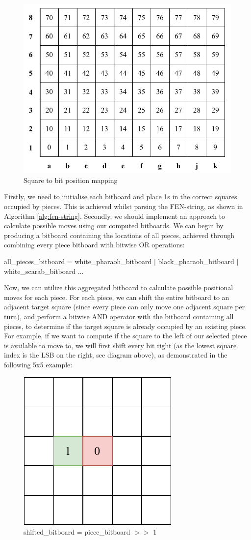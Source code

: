 \documentclass[../main/main.tex]{subfiles}
\begin{document}
\begin{figure}[H]
    \centering
    \includegraphics[width=0.6\columnwidth]{../design/assets/bitboard_indexes.pdf}
    \caption{Square to bit position mapping}
    \label{fig:bitboard-indexes}
\end{figure}

Firstly, we need to initialise each bitboard and place 1s in the correct squares occupied by pieces. This is achieved whilst parsing the FEN-string, as shown in Algorithm \ref{alg:fen-string}.
Secondly, we should implement an approach to calculate possible moves using our computed bitboards. We can begin by producing a bitboard containing the locations of all pieces, achieved through combining every piece bitboard with bitwise OR operations:

\begin{center}
all\_pieces\_bitboard = white\_pharaoh\_bitboard $\vert$  black\_pharaoh\_bitboard $\vert$ white\_scarab\_bitboard ...
\end{center}

Now, we can utilize this aggregated bitboard to calculate possible positional moves for each piece.
For each piece, we can shift the entire bitboard to an adjacent target square (since every piece can only move one adjacent square per turn), and perform a bitwise AND operator with the bitboard containing all pieces, to determine if the target square is already occupied by an existing piece. For example, if we want to compute if the square to the left of our selected piece is available to move to, we will first shift every bit right (as the lowest square index is the LSB on the right, see diagram above), as demonstrated in the following 5x5 example:

\begin{figure}[H]
    \centering
    \includegraphics[width=0.4\columnwidth]{../design/assets/bitboard_shifted.pdf}
    \caption{shifted\_bitboard = piece\_bitboard $>>$ 1}
    \label{fig:bitboard-shifted}
\end{figure}
\end{document}
